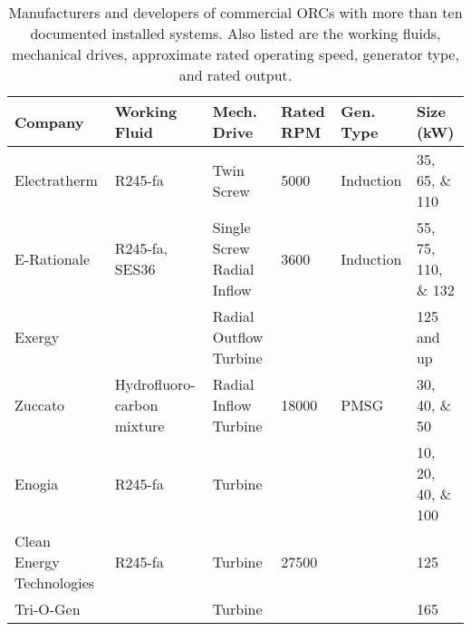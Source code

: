 \begin{table}
\centering
\caption{Manufacturers and developers of commercial ORCs with more than ten documented installed systems. Also listed are the working fluids, mechanical drives, approximate rated operating speed, generator type, and rated output.}
\label{tab:orc_manufacturers_com}
\begin{tabular}[c]{p{3.0cm}p{2.5cm}p{2.0cm}p{1.5cm}p{1.6cm}p{2.0cm}}%
	\toprule
	\textbf{Company}          & \textbf{Working Fluid}		& \textbf{Mech. Drive}			& \textbf{Rated RPM}	& \textbf{Gen. Type}	& \textbf{Size (kW)}  \\
	\midrule
	Electratherm              & R245-fa 					& Twin Screw 					& 5000				& Induction  			& \numlist{35;65;110} \\ 
	E-Rationale               & R245-fa, SES36 				& Single Screw Radial Inflow	& 3600				& Induction				& \numlist{55;75;110;132} \\ 
	Exergy                    &								& Radial Outflow Turbine		&            		& 						& 125 and up \\ 
	Zuccato                   & Hydrofluoro-carbon mixture	& Radial Inflow Turbine			& 18000				& PMSG 					& \numlist{30;40;50} \\ 
	Enogia                    & R245-fa						& Turbine 						& 					& 						& \numlist{10;20;40;100}\\ 
	Clean Energy Technologies & R245-fa						& Turbine 						& 27500				& 						& 125 \\ 
	Tri-O-Gen                 & 							& Turbine 						& 					& 						& 165 \\ \bottomrule

\end{tabular}
\end{table}


